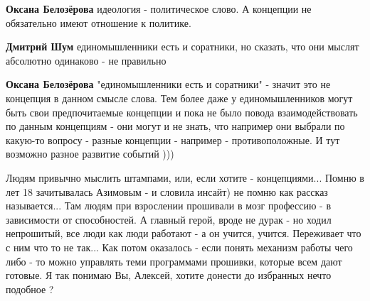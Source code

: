 \begin{itemize}
\begin{itemize}
\textbf{Оксана Белозёрова} идеология - политическое слово. А концепции не обязательно имеют отношение к политике.

 
\textbf{Дмитрий Шум} единомышленники есть и соратники, но сказать, что они мыслят абсолютно одинаково - не правильно

 
\textbf{Оксана Белозёрова} "единомышленники есть и соратники" - значит это не
концепция в данном смысле слова. Тем более даже у единомышленников могут быть
свои предпочитаемые концепции и пока не было повода взаимодействовать по данным
концепциям - они могут и не знать, что например они выбрали по какую-то вопросу
- разные концепции - например - противоположные. И тут возможно разное развитие
событий )))
\end{itemize}

 

Людям привычно мыслить штампами, или, если хотите - концепциями... Помню в лет
18 зачитывалась Азимовым - и словила инсайт) не помню как рассказ называется...
Там людям при взрослении прошивали в мозг профессию - в зависимости от
способностей. А главный герой, вроде не дурак - но ходил непрошитый, все люди
как люди работают - а он учится, учится. Переживает что с ним что то не так...
Как потом оказалось - если понять механизм работы чего либо - то можно
управлять теми программами прошивки, которые всем дают готовые. Я так понимаю
Вы, Алексей, хотите донести до избранных нечто подобное ? \Smiley[1.0][yellow]

\begin{itemize}
 

\end{itemize}
\end{itemize}

